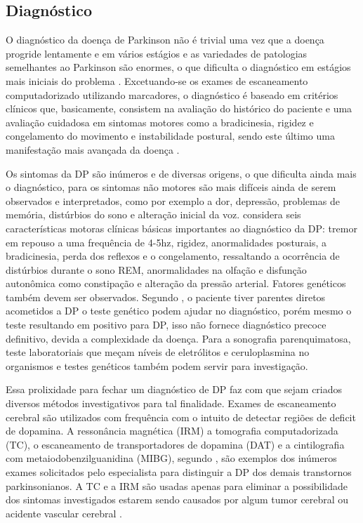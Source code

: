 \documentclass[
	12pt,				%
	openany,			%
	oneside,			%
	a4paper,			%
	english,			%
	french,				%
	spanish,			%
	brazil				%
	]{abntex2}
\begin{document}
\subsection{Diagnóstico}

O diagnóstico da doença de Parkinson não é trivial uma vez que a doença progride lentamente e em vários estágios e as variedades de patologias semelhantes ao Parkinson são enormes, o que dificulta o diagnóstico em estágios mais iniciais do problema \cite{ebook2016}. Excetuando-se os exames de escaneamento computadorizado utilizando marcadores, o diagnóstico é baseado em critérios clínicos que, basicamente, consistem na avaliação do histórico do paciente e uma avaliação cuidadosa em sintomas motores como a bradicinesia, rigidez e congelamento do movimento e instabilidade postural, sendo este último uma manifestação mais avançada da doença \cite{kalia2015}.

Os sintomas da DP são inúmeros e de diversas origens, o que dificulta ainda mais o diagnóstico, para  os sintomas não motores são mais difíceis ainda de serem observados e interpretados, como por exemplo a dor, depressão, problemas de memória, distúrbios do sono e alteração inicial da voz.  considera seis características motoras clínicas básicas importantes ao diagnóstico da DP: tremor em repouso a uma frequência de 4-5hz, rigidez, anormalidades posturais, a bradicinesia, perda dos reflexos e o congelamento, ressaltando a ocorrência de distúrbios durante o sono REM, anormalidades na olfação e disfunção autonômica como constipação e alteração da pressão arterial. Fatores genéticos também devem ser observados. Segundo , o paciente tiver parentes diretos acometidos a DP o teste genético podem ajudar no diagnóstico, porém mesmo o teste resultando em positivo para DP, isso não fornece diagnóstico precoce definitivo, devida a complexidade da doença. Para  a sonografia parenquimatosa, teste laboratoriais que meçam níveis de eletrólitos e ceruloplasmina no organismos e testes genéticos também podem servir para investigação.

Essa prolixidade para fechar um diagnóstico de DP faz com que sejam criados diversos métodos investigativos \cite{levine2003} para tal finalidade. Exames de escaneamento cerebral são utilizados com frequência com o intuito de detectar regiões de deficit de dopamina. A ressonância magnética (IRM) a tomografia computadorizada (TC), o escaneamento de transportadores de dopamina (DAT) e a cintilografia com metaiodobenzilguanidina (MIBG), segundo , são exemplos dos inúmeros exames solicitados pelo especialista para distinguir a DP dos demais transtornos parkinsonianos. A TC e a IRM são usadas apenas para eliminar a possibilidade dos sintomas investigados estarem sendo causados por algum tumor cerebral ou acidente vascular cerebral \cite{nolden2014}.
\end{document}
